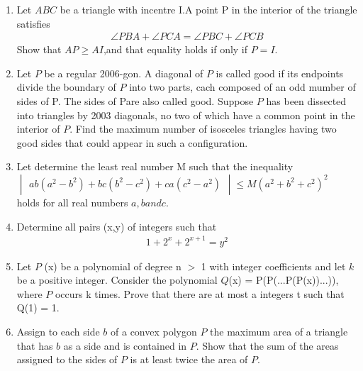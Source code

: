 \documentclass[12pt,-letter paper]{article}
\providecommand{\mydet}[1]{\ensuremath{\begin{vmatrix}#1\end{vmatrix}}}
\providecommand{\brak}[1]{\ensuremath{\left(#1\right)}}
\begin{document}
\begin{enumerate}
      \item Let $ABC$ be a triangle with incentre I.A point P in the interior of the triangle satisfies 
\begin{align*}
\angle{PBA} + \angle{PCA} = \angle{PBC}+ \angle{PCB}
\end{align*}
Show that $AP\geq{AI}$,and that equality holds if only if $P=I$.
     \item Let $P$ be a regular 2006-gon. A diagonal of $P$ is called good if its endpoints divide the boundary of $P$ into two parts, cach composed of an odd mumber of sides of P. The sides of Pare also called good.
Suppose $P$ has been dissected into triangles by 2003 diagonals, no two of which have a common point in the interior of $P$. Find the maximum number of isosceles triangles having two good sides that could appear in such a configuration.
     \item Let determine the least real number M such that the inequality \\ $\mydet{ab\brak{a^2-b^2}+bc\brak{b^2-c^2}+ca\brak{c^2-a^2}} \leq M\brak{a^2+b^2+c^2}^2$ \\ holds for all real numbers $a,b and c $. 
     \item Determine all pairs (x,y) of integers such that 
\begin{align*}
1+2^{x}+2^{x+1}=y^{2}
\end{align*}
     \item Let $P$ (x) be a polynomial of degree n $>$ 1 with integer coefficients and let $k$ be a positive integer. Consider the polynomial $Q$(x) = P(P(...P(P(x))...)), where $P$ occurs k times. Prove that there are at most a integers t such that Q(1) = 1. 
     \item Assign to each side $b$ of a convex polygon $P$ the maximum area of a triangle that has $b$ as a side and is contained in $P$. Show that the sum of the areas assigned to the sides of $P$ is at least twice the area of $P$.
\end{enumerate}
\end{document}
